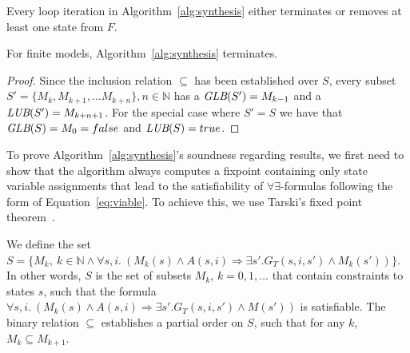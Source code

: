 \begin{lemma}
Every loop iteration in Algorithm~\ref{alg:synthesis} either terminates or removes at least one state from $F$.
\end{lemma}

\begin{theorem}
For finite models, Algorithm~\ref{alg:synthesis} terminates.
\end{theorem}




\iffalse
The system $\mathfrak{U} = \tuple{S, \subseteq}$ is a complete lattice, where every subset $S' \subseteq S$ has a greatest lower bound  $\glb(S') = \cap S'$  and a least upper bound $\lub(S') = \cup S'$.
\label{lem:altlattice}
\fi
\begin{proof}
Since the inclusion relation $\subseteq$ has been established over $S$, every subset $S' = \{M_k, M_{k+1}, \ldots M_{k+n}\}, n \in \mathbb{N}$ has a $\textit {GLB}(S') = M_{k-1}$ and a $\textit {LUB}(S') = M_{k+n+1}$. For the special case where $S' = S$ we have that $\textit {GLB}(S) = M_0 = false$ and $\textit {LUB}(S) = true$.
\end{proof}

\label{sec:soundness}
To prove Algorithm~\ref{alg:synthesis}'s soundness regarding results, we first need to show that the algorithm always computes a fixpoint containing only state variable assignments that lead to the satisfiability of $\forall\exists$-formulas following the form of Equation~\ref{eq:viable}. To achieve this, we
use Tarski's fixed point theorem~\cite{tarski1955lattice}.



We define the set $S = \{M_k, \ k \in \mathbb{N} \land \forall s, i. \ (M_k(s) \land A(s,i) \Rightarrow \exists s'. G_T(s,i,s') \land M_k(s'))\}$. In other words, $S$ is the set of subsets $M_k$, $k = 0, 1 , \ldots$ that contain constraints to states $s$, such that the formula $\forall s, i. \ (M_k(s) \land A(s,i) \Rightarrow \exists s'. G_T(s,i,s') \land M(s'))$ is satisfiable. The binary relation $\subseteq$ establishes a partial order on $S$, such that for any $k$, $M_k \subseteq M_{k+1}$.

